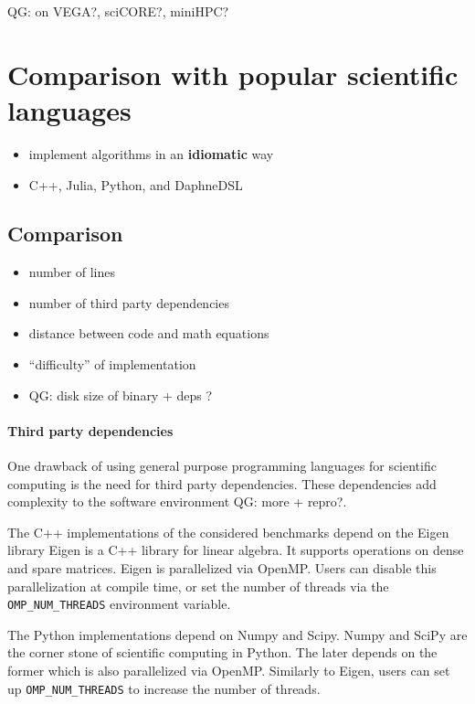 \documentclass[conference,10pt,a4paper]{IEEEtran}
\newcommand{\qg}[1]{{\color{blue} QG: #1}} %
\begin{document}
\qg{on VEGA?, sciCORE?, miniHPC?}

\section{Comparison with popular scientific languages}

\begin{itemize}
    \item implement algorithms in an \textbf{idiomatic} way
    \item C++, Julia, Python, and DaphneDSL
\end{itemize}

\subsection{Comparison}

\begin{itemize}
\item number of lines
\item number of third party dependencies
\item distance between code and math equations
\item ``difficulty'' of implementation
\item \qg{disk size of binary + deps ?}
\end{itemize}

\paragraph{Third party dependencies}

One drawback of using general purpose programming languages for scientific computing is the need for third party dependencies.
These dependencies add complexity to the software environment \qg{more + repro?}.

The C++ implementations of the considered benchmarks depend on the Eigen library
Eigen \cite{guennebaud2010eigen} is a C++ library for linear algebra.
It supports operations on dense and spare matrices.
Eigen is parallelized via OpenMP.
Users can disable this parallelization at compile time, or set the number of threads via the \texttt{OMP\_NUM\_THREADS} environment variable.

The Python implementations depend on Numpy and Scipy.
Numpy \cite{harris2020array} and SciPy \cite{virtanen2020scipy} are the corner stone of scientific computing in Python.
The later depends on the former which is also parallelized via OpenMP.
Similarly to Eigen, users can set up \texttt{OMP\_NUM\_THREADS} to increase the number of threads.
\end{document}
